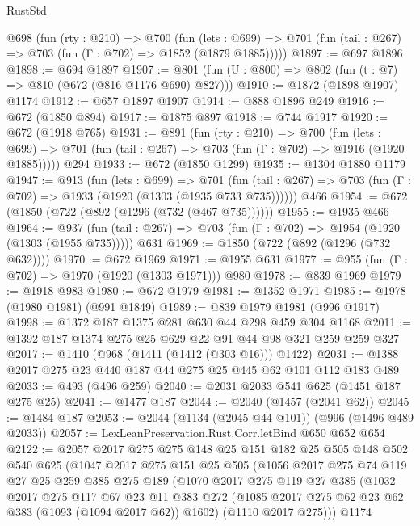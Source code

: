 \begin{lexlean}{RustStd}
\begin{coremodule}
  @698
    (fun (rty : @210) =>
    @700
      (fun (lets : @699) =>
      @701 (fun (tail : @267) => @703 (fun (Γ : @702) => @1852 (@1879 @1885)))))
@1897 := @697 @1896
@1898 := @694 @1897
@1907 := @801 (fun (U : @800) => @802 (fun (t : @7) => @810 (@672 (@816 @1176 @690) @827)))
@1910 := @1872 (@1898 @1907) @1174
@1912 := @657 @1897 @1907
@1914 := @888 @1896 @249
@1916 := @672 (@1850 @894)
@1917 := @1875 @897
@1918 := @744 @1917
@1920 := @672 (@1918 @765)
@1931 := @891
    (fun (rty : @210) =>
    @700
      (fun (lets : @699) =>
      @701 (fun (tail : @267) => @703 (fun (Γ : @702) => @1916 (@1920 @1885)))))
    @294
@1933 := @672 (@1850 @1299)
@1935 := @1304 @1880 @1179
@1947 := @913
    (fun (lets : @699) =>
    @701 (fun (tail : @267) => @703 (fun (Γ : @702) => @1933 (@1920 (@1303 (@1935 @733 @735))))))
    @466
@1954 := @672 (@1850 (@722 (@892 (@1296 (@732 (@467 @735))))))
@1955 := @1935 @466
@1964 := @937
    (fun (tail : @267) => @703 (fun (Γ : @702) => @1954 (@1920 (@1303 (@1955 @735)))))
    @631
@1969 := @1850 (@722 (@892 (@1296 (@732 @632))))
@1970 := @672 @1969
@1971 := @1955 @631
@1977 := @955 (fun (Γ : @702) => @1970 (@1920 (@1303 @1971))) @980
@1978 := @839 @1969
@1979 := @1918 @983
@1980 := @672 @1979
@1981 := @1352 @1971
@1985 := @1978 (@1980 @1981) (@991 @1849)
@1989 := @839 @1979 @1981 (@996 @1917)
@1998 := @1372 @187 @1375 @281 @630 @44 @298 @459 @304 @1168
@2011 := @1392 @187 @1374 @275 @25 @629 @22 @91 @44 @98 @321 @259 @259 @327
@2017 := @1410 (@968 (@1411 (@1412 (@303 @16))) @1422)
@2031 := @1388 @2017 @275 @23 @440 @187 @44 @275 @25 @445 @62 @101 @112 @183 @489
@2033 := @493 (@496 @259)
@2040 := @2031 @2033 @541 @625 (@1451 @187 @275 @25)
@2041 := @1477 @187
@2044 := @2040 (@1457 (@2041 @62))
@2045 := @1484 @187
@2053 := @2044 (@1134 (@2045 @44 @101)) (@996 (@1496 @489 @2033))
@2057 := LexLeanPreservation.Rust.Corr.letBind @650 @652 @654
@2122 := @2057
    @2017
    @275
    @275
    @148
    @25
    @151
    @182
    @25
    @505
    @148
    @502
    @540
    @625
    (@1047
      @2017
      @275
      @151
      @25
      @505
      (@1056
        @2017
        @275
        @74
        @119
        @27
        @25
        @259
        @385
        @275
        @189
        (@1070
          @2017
          @275
          @119
          @27
          @385
          (@1032
            @2017
            @275
            @117
            @67
            @23
            @11
            @383
            @272
            (@1085 @2017 @275 @62 @23 @62 @383 (@1093 (@1094 @2017 @62)) @1602)
            (@1110 @2017 @275)))
        @1174

\end{coremodule}
\end{lexlean}
